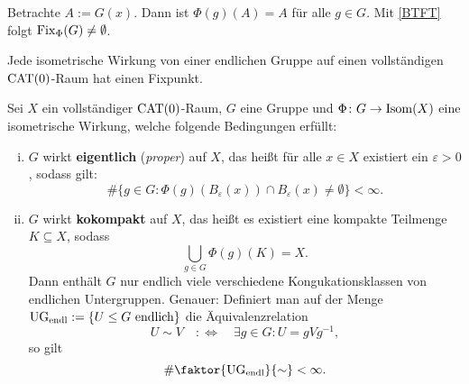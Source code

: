 \begin{beweis}
	Betrachte $A := G(x)$.
	Dann ist $\Phi(g)(A) = A$ für alle $g \in G$. Mit \autoref{BTFT} folgt $\operatorname{Fix}_\Phi(G) \neq \emptyset$.
\end{beweis}

\begin{bemerkung}
\label{bem:1.29}
	Jede isometrische Wirkung von einer endlichen Gruppe auf einen vollständigen $\operatorname{CAT(0)}$-Raum hat einen Fixpunkt.
\end{bemerkung}

\begin{korollar}
\label{kor:1.30}
	Sei $X$ ein vollständiger $\operatorname{CAT(0)}$-Raum, $G$ eine Gruppe und $\Phi \colon G \rightarrow \operatorname{Isom}(X)$ eine isometrische Wirkung, welche folgende Bedingungen erfüllt:
	\begin{enumerate}[(i)]
		\item $G$ wirkt \textbf{eigentlich} (\textit{proper}) auf $X$, das heißt für alle $x \in X$ existiert ein $\varepsilon > 0$, sodass gilt:	
		\[
			\#\{g \in G : \Phi(g)(B_\varepsilon(x)) \cap B_\varepsilon(x) \neq \emptyset\} < \infty.
		\]
		\item $G$ wirkt \textbf{kokompakt} auf $X$, das heißt es existiert eine kompakte Teilmenge $K \subseteq X$, sodass 
		\[
			\bigcup\limits_{g \in G} \Phi(g)(K) = X.
		\]
		Dann enthält $G$ nur endlich viele verschiedene Kongukationsklassen von endlichen Untergruppen.
		Genauer: Definiert man auf der Menge $\operatorname{UG_{endl}} := \{U \leq G \text{ endlich}\}$ die Äquivalenzrelation 
		\[
			U \sim V \quad :\Leftrightarrow \quad \exists g \in G : U = gVg^{-1},
		\]
		so gilt
		\[
			\# \faktor{\UGend}{\sim} < \infty.
		\]
	\end{enumerate}
\end{korollar}

